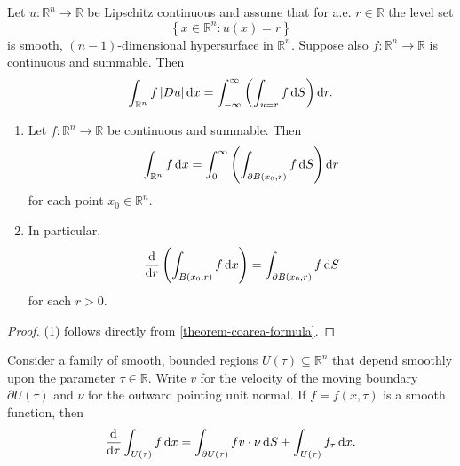 \begin{theorem}
  \label{theorem-coarea-formula}
  Let \( u: \mathbb{R}^n \to \mathbb{R} \) be Lipschitz continuous and assume that for a.e. \( r \in \mathbb{R} \) the level set
  \[
    \left\lbrace x \in \mathbb{R}^n: u(x) = r \right\rbrace
  \]
  is smooth, \( (n - 1) \)-dimensional hypersurface in \( \mathbb{R}^n \).
  Suppose also \( f: \mathbb{R}^n \to \mathbb{R} \) is continuous and summable.
  Then
  \[
    \int_{\mathbb{R}^n} f \left\lvert D u \right\rvert \mathop{}\!\mathrm{d} x = \int_{-\infty}^{\infty} \left( \int_{u = r} f \mathop{}\!\mathrm{d} S \right) \mathop{}\!\mathrm{d} r.
  \]
\end{theorem}

\begin{theorem}
  \label{theorem-polar-coordinates}
  \begin{enumerate}
    \item Let \( f: \mathbb{R}^n \to \mathbb{R} \) be continuous and summable.
      Then
      \[
        \int_{\mathbb{R}^n} f \mathop{}\!\mathrm{d} x = \int_0^{\infty}\left( \int_{\partial B(x_0, r)} f \mathop{}\!\mathrm{d} S \right) \mathop{}\!\mathrm{d} r
      \]
      for each point \( x_0 \in \mathbb{R}^n \).
    \item In particular,
      \[
        \frac{\mathop{}\!\mathrm{d} }{\mathop{}\!\mathrm{d} r}\left( \int_{B(x_0, r)} f \mathop{}\!\mathrm{d} x \right) = \int_{\partial B(x_0, r)} f \mathop{}\!\mathrm{d} S
      \]
      for each \( r > 0 \).
  \end{enumerate}
\end{theorem}
\begin{proof}
  (1) follows directly from \ref{theorem-coarea-formula}.
\end{proof}

\begin{theorem}
  \label{theorem-differentiation-formula-for-moving-regions}
  Consider a family of smooth, bounded regions \( U(\tau) \subseteq \mathbb{R}^n \) that depend smoothly upon the parameter \( \tau \in \mathbb{R} \).
  Write \( v \) for the velocity of the moving boundary \( \partial U(\tau) \) and \( \nu \) for the outward pointing unit normal.
  If \( f = f(x, \tau) \) is a smooth function, then
  \[
    \frac{\mathop{}\!\mathrm{d} }{\mathop{}\!\mathrm{d} \tau}\int_{U(\tau)} f \mathop{}\!\mathrm{d} x = \int_{\partial U(\tau)} f v \cdot \nu \mathop{}\!\mathrm{d} S + \int_{U(\tau)} f_{\tau} \mathop{}\!\mathrm{d} x.
  \]
\end{theorem}

